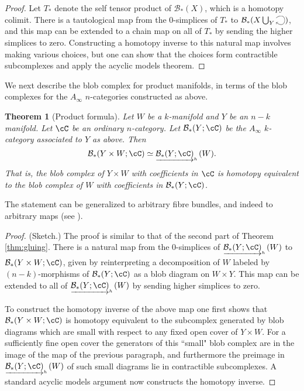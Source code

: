 \documentclass{pnastwo}
\def\bc{{\mathcal B}}
\newcommand{\clh}[1]{\underrightarrow{#1}_{{}_{{}_{{}_h}}}}
\newcommand{\selfarrow}{\ensuremath{\smash{\tikz[baseline]{\clip (0,0.36) rectangle (0.39,-0.16); \draw[->] (0,0.2) .. controls (0.5,0.6) and (0.5,-0.4) .. (0,0);}}}}
\newtheorem{thm}[prop]{Theorem}
\def\nn#1{{{\color[rgb]{.2,.5,.6} \small [[#1]]}}}
\begin{document}
\begin{article}
\begin{proof}
Let $T_*$ denote the self tensor product of $\bc_*(X)$, which is a homotopy colimit.
There is a tautological map from the 0-simplices of $T_*$ to $\bc_*(X\bigcup_Y \selfarrow)$,
and this map can be extended to a chain map on all of $T_*$ by sending the higher simplices to zero.
Constructing a homotopy inverse to this natural map involves making various choices, but one can show that the
choices form contractible subcomplexes and apply the acyclic models theorem.
\end{proof}

We next describe the blob complex for product manifolds, in terms of the 
blob complexes for the $A_\infty$ $n$-categories constructed as above.

\begin{thm}[Product formula]
\label{thm:product}
Let $W$ be a $k$-manifold and $Y$ be an $n{-}k$ manifold.
Let $\cC$ be an ordinary $n$-category.
Let $\bc_*(Y;\cC)$ be the $A_\infty$ $k$-category associated to $Y$ as above.
Then
\[
	\bc_*(Y\times W; \cC) \simeq \clh{\bc_*(Y;\cC)}(W).
\]
That is, the blob complex of $Y\times W$ with coefficients in $\cC$ is homotopy equivalent
to the blob complex of $W$ with coefficients in $\bc_*(Y;\cC)$.
\end{thm}
The statement can be generalized to arbitrary fibre bundles, and indeed to arbitrary maps
(see \cite[\S7.1]{1009.5025}).

\begin{proof} (Sketch.)
The proof is similar to that of the second part of Theorem \ref{thm:gluing}.
There is a natural map from the 0-simplices of $\clh{\bc_*(Y;\cC)}(W)$ to $\bc_*(Y\times W; \cC)$,
given by reinterpreting a decomposition of $W$ labeled by $(n{-}k)$-morphisms of $\bc_*(Y; \cC)$ as a blob 
diagram on $W\times Y$.
This map can be extended to all of $\clh{\bc_*(Y;\cC)}(W)$ by sending higher simplices to zero.

To construct the homotopy inverse of the above map one first shows that
$\bc_*(Y\times W; \cC)$ is homotopy equivalent to the subcomplex generated by blob diagrams which
are small with respect to any fixed open cover of $Y\times W$.
For a sufficiently fine open cover the generators of this ``small" blob complex are in the image of the map
of the previous paragraph, and furthermore the preimage in $\clh{\bc_*(Y;\cC)}(W)$ of such small diagrams
lie in contractible subcomplexes.
A standard acyclic models argument now constructs the homotopy inverse.
\end{proof}



\end{article}
\end{document}
